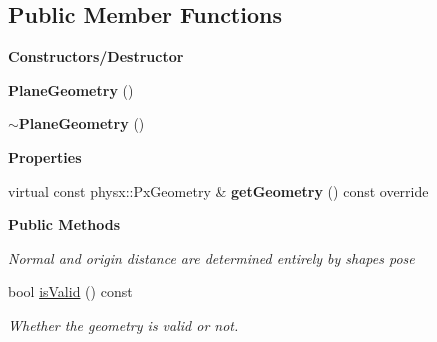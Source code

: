 \subsection*{Public Member Functions}
\begin{Indent}\textbf{ Constructors/\+Destructor}\par
\begin{DoxyCompactItemize}
\item 
\mbox{\label{classrev_1_1_plane_geometry_ab9a5f0d3e11457ccc568801d5aaf1644}} 
{\bfseries Plane\+Geometry} ()
\item 
\mbox{\label{classrev_1_1_plane_geometry_a296b5881b502cceaf29d24ac688da6f8}} 
{\bfseries $\sim$\+Plane\+Geometry} ()
\end{DoxyCompactItemize}
\end{Indent}
\begin{Indent}\textbf{ Properties}\par
\begin{DoxyCompactItemize}
\item 
\mbox{\label{classrev_1_1_plane_geometry_a363b274e3ce2881b389836c66ffa6ac1}} 
virtual const physx\+::\+Px\+Geometry \& {\bfseries get\+Geometry} () const override
\end{DoxyCompactItemize}
\end{Indent}
\begin{Indent}\textbf{ Public Methods}\par
{\em Normal and origin distance are determined entirely by shape\textquotesingle{}s pose }\begin{DoxyCompactItemize}
\item 
\mbox{\label{classrev_1_1_plane_geometry_aaaad809730fed746893fd06daa5bcd51}} 
bool \mbox{\hyperlink{classrev_1_1_plane_geometry_aaaad809730fed746893fd06daa5bcd51}{is\+Valid}} () const
\begin{DoxyCompactList}\small\item\em Whether the geometry is valid or not. \end{DoxyCompactList}\end{DoxyCompactItemize}
\end{Indent}
